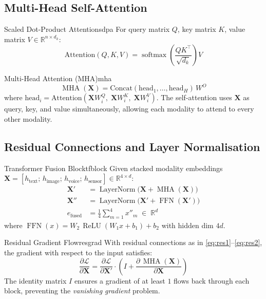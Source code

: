 \documentclass[12pt,a4paper]{article}
\newcommand{\MHA}{\operatorname{MHA}}
\newcommand{\LN}{\operatorname{LayerNorm}}
\newcommand{\FFN}{\operatorname{FFN}}
\newcommand{\ReLU}{\operatorname{ReLU}}
\newcommand{\softmax}{\operatorname{softmax}}
\newcommand{\efused}{e_{\text{fused}}}
\newcommand{\R}{\mathbb{R}}
\begin{document}
\subsection{Multi-Head Self-Attention}

\begin{definition}{Scaled Dot-Product Attention}{sdpa}
For query matrix $Q$, key matrix $K$, value matrix $V \in \R^{n \times d_k}$:
\[
  \text{Attention}(Q, K, V)
  = \softmax\!\left(\frac{QK^\top}{\sqrt{d_k}}\right) V
\]
\end{definition}

\begin{definition}{Multi-Head Attention (MHA)}{mha}
\[
  \MHA(\mathbf{X}) = \text{Concat}(\text{head}_1,\ldots,\text{head}_H)\,W^O
\]
where $\text{head}_i = \text{Attention}(\mathbf{X}W_i^Q,\;\mathbf{X}W_i^K,\;\mathbf{X}W_i^V)$.
The self-attention uses $\mathbf{X}$ as query, key, and value simultaneously,
allowing each modality to attend to every other modality.
\end{definition}

\subsection{Residual Connections and Layer Normalisation}

\begin{definition}{Transformer Fusion Block}{tfblock}
Given stacked modality embeddings
$\mathbf{X} = [h_\text{text};\,h_\text{image};\,h_\text{voice};\,h_\text{sensor}]
\in \R^{4 \times d}$:
\begin{align}
  \mathbf{X}' &= \LN\!\bigl(\mathbf{X} + \MHA(\mathbf{X})\bigr) \label{eq:res1}\\
  \mathbf{X}''&= \LN\!\bigl(\mathbf{X}' + \FFN(\mathbf{X}')\bigr) \label{eq:res2}\\
  \efused     &= \frac{1}{4}\sum_{m=1}^{4} x''_m \;\in\; \R^d \label{eq:pool}
\end{align}
where $\FFN(x) = W_2\,\ReLU(W_1 x + b_1) + b_2$ with hidden dim $4d$.
\end{definition}

\begin{lemma}{Residual Gradient Flow}{resgrad}
With residual connections as in \eqref{eq:res1}--\eqref{eq:res2}, the gradient with
respect to the input satisfies:
\[
  \frac{\partial \mathcal{L}}{\partial \mathbf{X}}
  = \frac{\partial \mathcal{L}}{\partial \mathbf{X}'}
    \cdot \left(I + \frac{\partial\, \MHA(\mathbf{X})}{\partial \mathbf{X}}\right)
\]
The identity matrix $I$ ensures a gradient of at least $1$ flows back through each
block, preventing the \emph{vanishing gradient} problem.
\end{lemma}
\end{document}
